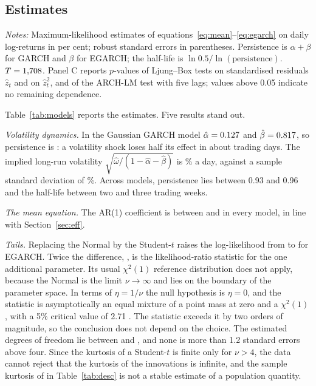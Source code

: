 \documentclass[11pt,a4paper]{article}
\newcommand{\tabnote}[1]{\par\vspace{5pt}\begin{minipage}{\linewidth}\setstretch{1.0}\footnotesize\textit{Notes:} #1\end{minipage}}
\begin{document}
\subsection{Estimates}

\begin{table}[t]
\centering
\caption{AR(1)--GARCH and AR(1)--EGARCH estimates}\label{tab:models}
\small

\tabnote{Maximum-likelihood estimates of equations~\eqref{eq:mean}--\eqref{eq:egarch} on daily log-returns in per cent; robust standard errors in parentheses. Persistence is $\alpha+\beta$ for GARCH and $\beta$ for EGARCH; the half-life is $\ln 0.5/\ln(\text{persistence})$. $T=1{,}708$. Panel C reports $p$-values of Ljung--Box tests on standardised residuals $\hat z_t$ and on $\hat z_t^2$, and of the ARCH-LM test with five lags; values above 0.05 indicate no remaining dependence.}
\end{table}

Table~\ref{tab:models} reports the estimates. Five results stand out.

\emph{Volatility dynamics.} In the Gaussian GARCH model $\hat\alpha=0.127$ and $\hat\beta=0.817$, so persistence is \gnPers{}: a volatility shock loses half its effect in about \gnHalf{} trading days. The implied long-run volatility $\sqrt{\hat\omega/(1-\hat\alpha-\hat\beta)}$ is \gnUncond\% a day, against a sample standard deviation of \aruSD\%. Across models, persistence lies between 0.93 and 0.96 and the half-life between two and three trading weeks.

\emph{The mean equation.} The AR(1) coefficient is between \gnPhi{} and \enPhi{} in every model, in line with Section~\ref{sec:eff}.

\emph{Tails.} Replacing the Normal by the Student-$t$ raises the log-likelihood from \enLL{} to \etLL{} for EGARCH. Twice the difference, \lrNormT{}, is the likelihood-ratio statistic for the one additional parameter. Its usual $\chi^2(1)$ reference distribution does not apply, because the Normal is the limit $\nu\to\infty$ and lies on the boundary of the parameter space. In terms of $\eta=1/\nu$ the null hypothesis is $\eta=0$, and the statistic is asymptotically an equal mixture of a point mass at zero and a $\chi^2(1)$, with a 5\% critical value of 2.71 \citep{fiorentini2003}. The statistic exceeds it by two orders of magnitude, so the conclusion does not depend on the choice. The estimated degrees of freedom lie between \gtNu{} and \esNu{}, and none is more than 1.2 standard errors above four. Since the kurtosis of a Student-$t$ is finite only for $\nu>4$, the data cannot reject that the kurtosis of the innovations is infinite, and the sample kurtosis of \aruKurt{} in Table~\ref{tab:desc} is not a stable estimate of a population quantity.
\end{document}
